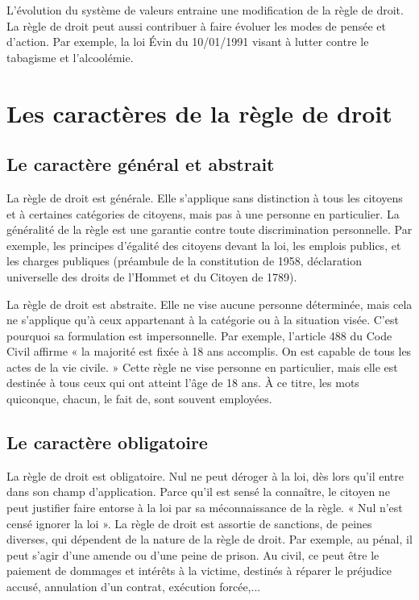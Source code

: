 \documentclass[11pt]{article}
\begin{document}
			L'évolution du système de valeurs entraine une modification de la règle de droit. La règle de droit peut aussi contribuer à faire évoluer les modes de pensée et d'action. Par exemple, la loi Évin du 10/01/1991 visant à lutter contre le tabagisme et l'alcoolémie.
			
	\section{Les caractères de la règle de droit}
		\subsection{Le caractère général et abstrait}
			La règle de droit est générale. Elle s'applique sans distinction à tous les citoyens et à certaines catégories de citoyens, mais pas à une personne en particulier. La généralité de la règle est une garantie contre toute discrimination personnelle. Par exemple, les principes d'égalité des citoyens devant la loi, les emplois publics, et les charges publiques (préambule de la constitution de 1958, déclaration universelle des droits de l'Hommet et du Citoyen de 1789).
			
			La règle de droit est abstraite. Elle ne vise aucune personne déterminée, mais cela ne s'applique qu'à ceux appartenant à la catégorie ou à la situation visée. C'est pourquoi sa formulation est impersonnelle. Par exemple, l'article 488 du Code Civil affirme « la majorité est fixée à 18 ans accomplis. On est capable de tous les actes de la vie civile. » Cette règle ne vise personne en particulier, mais elle est destinée à tous ceux qui ont atteint l'âge de 18 ans. À ce titre, les mots quiconque, chacun, le fait de, sont souvent employées.
			
		\subsection{Le caractère obligatoire}
			La règle de droit est obligatoire. Nul ne peut déroger à la loi, dès lors qu'il entre dans son champ d'application. Parce qu'il est sensé la connaître, le citoyen ne peut justifier faire entorse à la loi par sa méconnaissance de la règle. « Nul n'est censé ignorer la loi ». La règle de droit est assortie de sanctions, de peines diverses, qui dépendent de la nature de la règle de droit. Par exemple, au pénal, il peut s'agir d'une amende ou d'une peine de prison. Au civil, ce peut être le paiement de dommages et intérêts à la victime, destinés à réparer le préjudice accusé, annulation d'un contrat, exécution forcée,...
			
\end{document}
